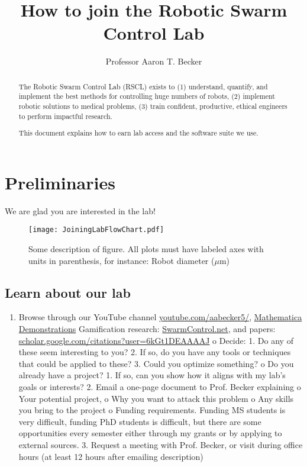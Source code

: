 \documentclass[letterpaper, 10 pt, conference]{ieeeconf}
\begin{document}
\author{Professor Aaron T. Becker}
\title{How to join the Robotic Swarm Control Lab}
\maketitle

\begin{abstract}
The Robotic Swarm Control Lab (RSCL) exists to
 (1) understand, quantify, and implement the best methods for controlling huge numbers of robots, 
 (2)  implement robotic solutions to medical problems, 
 (3)  train confident, productive, ethical engineers to perform impactful research.

This document explains how to earn lab access and the software suite we use.
\end{abstract}

\section{Preliminaries}

We are glad you are interested in the lab!  

\begin{figure}[h]
\begin{center}
\texttt{[image: JoiningLabFlowChart.pdf]}
\caption{Some description of figure.  All plots must have labeled axes with units in parenthesis, for instance:  Robot diameter ($\mu$m)}
\end{center}
\end{figure}


\subsection{Learn about our lab}

\begin{enumerate}
\item Browse through 
 our YouTube channel \href{www.youtube.com/aabecker5/}{youtube.com/aabecker5/}, 	\href{http://demonstrations.wolfram.com/author.html?author=Aaron+Becker}{Mathematica Demonstrations}
Gamification research: \href{www.SwarmControl.net}{SwarmControl.net}, 
and papers: \href{scholar.google.com/citations?user=6kGt1DEAAAAJ}{scholar.google.com/citations?user=6kGt1DEAAAAJ}
o	Decide: 
1.	Do any of these seem interesting to you? 
2.	If so, do you have any tools or techniques that could be applied to these?  
3.	Could you optimize something?
o	Do you already have a project?  
1.	If so, can you show how it aligns with my lab's goals or interests?
2.	Email a one-page document to Prof. Becker explaining 
o	Your potential project, 
o	Why you want to attack this problem
o	Any skills you bring to the project
o	Funding requirements.  Funding MS students is very difficult, funding PhD students is difficult, but there are some opportunities every semester either through my grants or by applying to external sources.
3.	Request a meeting with Prof. Becker, or visit during office hours (at least 12 hours after emailing description)
\end{enumerate}
\end{document}
